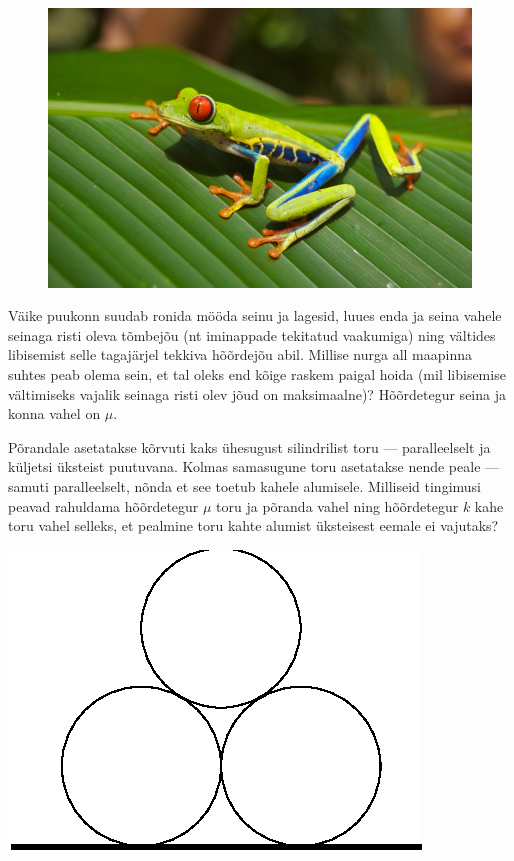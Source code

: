 \documentclass[10pt, twoside]{article}
\begin{document}
{
\begin{figure}
	\vspace{-1.8ex}
	\includegraphics[width=\linewidth]{2010-lahg-09-Red_eyed_tree_frog}
	\vspace{-4ex}
\end{figure}
Väike puukonn suudab ronida mööda seinu ja lagesid, luues enda ja seina vahele 
seinaga risti oleva tõmbejõu (nt iminappade tekitatud vaakumiga) ning vältides libisemist 
selle tagajärjel tekkiva hõõrdejõu abil.
Millise nurga all maapinna suhtes peab olema sein, et tal oleks end kõige raskem paigal hoida 
(mil libisemise vältimiseks vajalik seinaga risti olev jõud on maksimaalne)?
Hõõrdetegur seina ja konna vahel on $\mu$.
\probend
\bigskip


Põrandale asetatakse kõrvuti kaks ühesugust silindrilist toru --- paralleelselt ja küljetsi üksteist puutuvana. Kolmas samasugune toru asetatakse nende peale --- samuti paralleelselt, nõnda et see toetub kahele alumisele.
Milliseid tingimusi peavad rahuldama hõõrdetegur $\mu$ toru ja põranda vahel ning hõõrdetegur $k$ kahe toru vahel
selleks, et pealmine toru kahte alumist üksteisest eemale ei vajutaks?

\begin{center}
	\includegraphics[width=0.3\linewidth]{2010-v2g-10-torud.eps}
\end{center}
\probend
\bigskip

}
\end{document}
